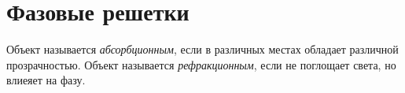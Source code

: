 \section{Фазовые решетки}




\begin{to_def}
    Объект называется \textit{абсорбционным}, если в различных местах обладает различной прозрачностью. Объект называется \textit{рефракционным}, если не поглощает света, но влиеяет на фазу. 
\end{to_def}







